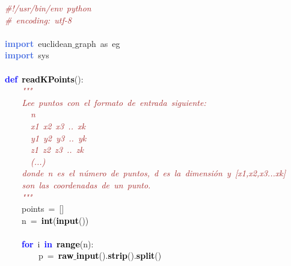 \noindent
\mbox{}\textit{\textcolor{Brown}{\#!/usr/bin/env\ python}} \\
\mbox{}\textit{\textcolor{Brown}{\#\ encoding:\ utf-8}} \\
\mbox{} \\
\mbox{}\textbf{\textcolor{RoyalBlue}{import}}\ euclidean$\_$graph\ as\ eg \\
\mbox{}\textbf{\textcolor{RoyalBlue}{import}}\ sys \\
\mbox{} \\
\mbox{}\textbf{\textcolor{Blue}{def}}\ \textbf{\textcolor{Black}{readKPoints}}\textcolor{BrickRed}{():} \\
\mbox{}\textit{\textcolor{Brown}{\ \ \ \ "{}"{}"{}}} \\
\mbox{}\textit{\textcolor{Brown}{\ \ \ \ Lee\ puntos\ con\ el\ formato\ de\ entrada\ siguiente:}} \\
\mbox{}\textit{\textcolor{Brown}{\ \ \ \ \ \ n}} \\
\mbox{}\textit{\textcolor{Brown}{\ \ \ \ \ \ x1\ x2\ x3\ ..\ xk}} \\
\mbox{}\textit{\textcolor{Brown}{\ \ \ \ \ \ y1\ y2\ y3\ ..\ yk}} \\
\mbox{}\textit{\textcolor{Brown}{\ \ \ \ \ \ z1\ z2\ z3\ ..\ zk}} \\
\mbox{}\textit{\textcolor{Brown}{\ \ \ \ \ \ (...)}} \\
\mbox{}\textit{\textcolor{Brown}{\ \ \ \ donde\ n\ es\ el\ número\ de\ puntos,\ d\ es\ la\ dimensión\ y\ [x1,x2,x3...xk]\ }} \\
\mbox{}\textit{\textcolor{Brown}{\ \ \ \ son\ las\ coordenadas\ de\ un\ punto.}} \\
\mbox{}\textit{\textcolor{Brown}{\ \ \ \ "{}"{}"{}}} \\
\mbox{}\ \ \ \ points\ \textcolor{BrickRed}{=}\ \textcolor{BrickRed}{[]} \\
\mbox{}\ \ \ \ n\ \textcolor{BrickRed}{=}\ \textbf{\textcolor{Black}{int}}\textcolor{BrickRed}{(}\textbf{\textcolor{Black}{input}}\textcolor{BrickRed}{())} \\
\mbox{} \\
\mbox{}\ \ \ \ \textbf{\textcolor{Blue}{for}}\ i\ \textbf{\textcolor{Blue}{in}}\ \textbf{\textcolor{Black}{range}}\textcolor{BrickRed}{(}n\textcolor{BrickRed}{):} \\
\mbox{}\ \ \ \ \ \ \ \ p\ \textcolor{BrickRed}{=}\ \textbf{\textcolor{Black}{raw$\_$input}}\textcolor{BrickRed}{().}\textbf{\textcolor{Black}{strip}}\textcolor{BrickRed}{().}\textbf{\textcolor{Black}{split}}\textcolor{BrickRed}{()} \\
